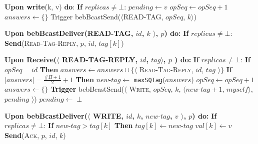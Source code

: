 \documentclass[10pt,a4paper,twocolumn]{article}
\begin{document}
\appendix
\begin{algorithm}
  \label{code:ABDSMRRW}
	\caption{Key-Value Store Replication Using Majority Quorums (Write \& Read)}
	\begin{algorithmic}

		\State \textbf{Upon write}(k, v) \textbf{do}:
		\State \hspace{1em} \textbf{If} \textsc{$replicas \neq \bot$}:
		\State \hspace{3em} $pending \leftarrow v$
		\State \hspace{3em} $opSeq \leftarrow opSeq + 1$
		\State \hspace{3em} $answers \leftarrow \{\}$
		\State \hspace{3em} Trigger bebBcastSend($\langle$READ-TAG, $opSeq$, $k$$\rangle$)
					\State

					\State \textbf{Upon bebBcastDeliver(READ-TAG, $id$, $k$ $\rangle$, $p$) do:}
					\State \hspace{1em} \textbf{If} \textsc{$replicas \neq \bot$}:
					\State \hspace{3em} \textbf{Send}(\textsc{Read-Tag-Reply}, $p$, $id$, $tag[k]$)
					\State

					\State \textbf{Upon Receive($\langle$ READ-TAG-REPLY, $id$, $tag$$\rangle$, $p$ ) do:}
					\State \hspace{1em} \textbf{If} \textsc{$replicas \neq \bot$}:
					\State \hspace{3em} \textbf{If} $opSeq = id$ \textbf{Then}
					\State \hspace{5em} $answers \leftarrow answers \cup \{\langle$ \textsc{Read-Tag-Reply}, $id$, $tag$ $\rangle\}$
					\State \hspace{5em} \textbf{If} $|answers| = \frac{\#\Pi+1}{2} + 1$ \textbf{Then}
					\State \hspace{6em} $new\text{-}tag \leftarrow$ \texttt{maxSQTag}($answers$)
					\State \hspace{6em} $opSeq \leftarrow opSeq + 1$
					\State \hspace{6em} $answers \leftarrow \{\}$
					\State \hspace{6em} \textbf{Trigger} bebBcastSend($\langle$ \textsc{Write}, $opSeq$, $k$, $\langle new\text{-}tag + 1$, $myself \rangle$, $pending$ $\rangle$)
					\State \hspace{6em} $pending \leftarrow \perp$
					\State

					\State \textbf{Upon bebBcastDeliver($\langle$ WRITE, $id$, $k$, $new\text{-}tag$, $v$ $\rangle$, $p$) do:}
					\State \hspace{1em} \textbf{If} \textsc{$replicas \neq \bot$}:
					\State \hspace{3em} \textbf{If} $new\text{-}tag > tag[k]$ \textbf{Then}
					\State \hspace{5em} $tag[k] \leftarrow new\text{-}tag$
					\State \hspace{5em} $val[k] \leftarrow v$
					\State \hspace{3em} \textbf{Send}(\textsc{Ack}, $p$, $id$, $k$)
					\State


\end{algorithmic}
\end{algorithm}
\end{document}
